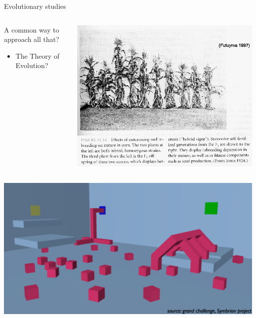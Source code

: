 \documentclass[8pt, handout=show,notes=show]{beamer}
\begin{document}
\begin{frame}{Evolutionary studies}
\begin{columns}
\begin{column}{.6\textwidth}
\begin{exampleblock}{A common way to approach all that?}
			    \begin{itemize}
				    \item The Theory of Evolution?
			    \end{itemize}
		    \end{exampleblock}
	    \end{column}
	    \begin{column}{.2\textwidth}
		    \includegraphics[width=.9\textwidth]{images/hybrid.png}
	    \end{column}
    \end{columns}

    \begin{columns}
	    \begin{column}{.2\textwidth}
		    \includegraphics[width=.9\textwidth]{images/symbrion-gc1b.png}
		    

\end{column}
\end{columns}
\end{frame}
\end{document}
